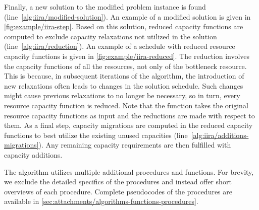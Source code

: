 \begin{steps}
    \item
    Finally, a new solution to the modified problem instance is found (line~\ref{alg:iira/modified-solution}).
    An example of a modified solution is given in \cref{fig:example/iira-step}.
    Based on this solution,
    reduced capacity functions are computed to exclude capacity relaxations
    not utilized in the solution (line~\ref{alg:iira/reduction}).
    An example of a schedule with reduced resource capacity functions is given in \cref{fig:example/iira-reduced}.
    The reduction involves the capacity functions of all the resources, not only of the bottleneck resource.
    This is because, in subsequent iterations of the algorithm,
    the introduction of new relaxations often leads to changes in the solution schedule.
    Such changes might cause previous relaxations to no longer be necessary,
    so in turn, every resource capacity function is reduced.
    Note that the function 
    takes the original resource capacity functions as input
    and the reductions are made with respect to them.
    As a final step, capacity migrations are computed in the reduced capacity functions
    to best utilize the existing unused capacities (line~\ref{alg:iira/additions-migrations}).
    Any remaining capacity requirements are then fulfilled with capacity additions.
\end{steps}

The algorithm utilizes multiple additional procedures and functions.
For brevity, we exclude the detailed specifics of the procedures
and instead offer short overviews of each procedure.
Complete pseudocodes of the procedures are available in \cref{sec:attachments/algorithms-functions-procedures}.

